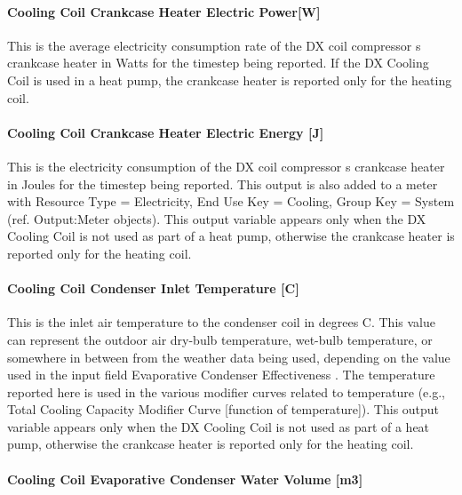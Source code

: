 \paragraph{Cooling Coil Crankcase Heater Electric Power{[}W{]}}\label{cooling-coil-crankcase-heater-electric-powerw}

This is the average electricity consumption rate of the DX coil compressor s crankcase heater in Watts for the timestep being reported. If the DX Cooling Coil is used in a heat pump, the crankcase heater is reported only for the heating coil.

\paragraph{Cooling Coil Crankcase Heater Electric Energy {[}J{]}}\label{cooling-coil-crankcase-heater-electric-energy-j}

This is the electricity consumption of the DX coil compressor s crankcase heater in Joules for the timestep being reported. This output is also added to a meter with Resource Type = Electricity, End Use Key = Cooling, Group Key = System (ref. Output:Meter objects). This output variable appears only when the DX Cooling Coil is not used as part of a heat pump, otherwise the crankcase heater is reported only for the heating coil.

\paragraph{Cooling Coil Condenser Inlet Temperature {[}C{]}}\label{cooling-coil-condenser-inlet-temperature-c}

This is the inlet air temperature to the condenser coil in degrees C. This value can represent the outdoor air dry-bulb temperature, wet-bulb temperature, or somewhere in between from the weather data being used, depending on the value used in the input field Evaporative Condenser Effectiveness . The temperature reported here is used in the various modifier curves related to temperature (e.g., Total Cooling Capacity Modifier Curve {[}function of temperature{]}). This output variable appears only when the DX Cooling Coil is not used as part of a heat pump, otherwise the crankcase heater is reported only for the heating coil.

\paragraph{Cooling Coil Evaporative Condenser Water Volume {[}m3{]}}\label{cooling-coil-evaporative-condenser-water-volume-m3}

